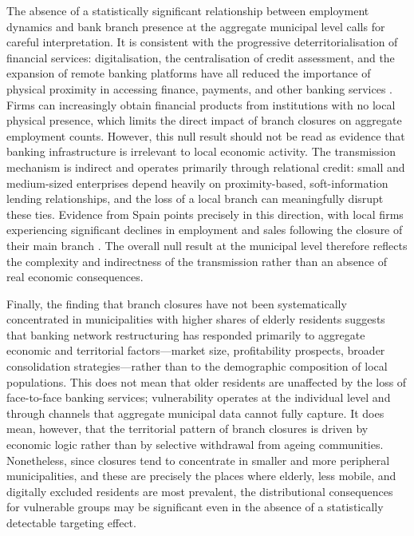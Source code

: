 \documentclass[a4paper,11pt,oneside]{article}
\begin{document}
{The absence of a statistically significant relationship between employment dynamics and bank branch presence at the aggregate municipal level calls for careful interpretation. It is consistent with the progressive deterritorialisation of financial services: digitalisation, the centralisation of credit assessment, and the expansion of remote banking platforms have all reduced the importance of physical proximity in accessing finance, payments, and other banking services \citep{petersen2002does,deyoung2007internet,alessandrini2009banks}. Firms can increasingly obtain financial products from institutions with no local physical presence, which limits the direct impact of branch closures on aggregate employment counts. However, this null result should not be read as evidence that banking infrastructure is irrelevant to local economic activity. The transmission mechanism is indirect and operates primarily through relational credit: small and medium-sized enterprises depend heavily on proximity-based, soft-information lending relationships, and the loss of a local branch can meaningfully disrupt these ties. Evidence from Spain points precisely in this direction, with local firms experiencing significant declines in employment and sales following the closure of their main branch \citep{jimenez2022bank,bonfim2021sorry,nguyen2019credit}. The overall null result at the municipal level therefore reflects the complexity and indirectness of the transmission rather than an absence of real economic consequences.

Finally, the finding that branch closures have not been systematically concentrated in municipalities with higher shares of elderly residents suggests that banking network restructuring has responded primarily to aggregate economic and territorial factors---market size, profitability prospects, broader consolidation strategies---rather than to the demographic composition of local populations. This does not mean that older residents are unaffected by the loss of face-to-face banking services; vulnerability operates at the individual level and through channels that aggregate municipal data cannot fully capture. It does mean, however, that the territorial pattern of branch closures is driven by economic logic rather than by selective withdrawal from ageing communities. Nonetheless, since closures tend to concentrate in smaller and more peripheral municipalities, and these are precisely the places where elderly, less mobile, and digitally excluded residents are most prevalent, the distributional consequences for vulnerable groups may be significant even in the absence of a statistically detectable targeting effect.


}
\end{document}
